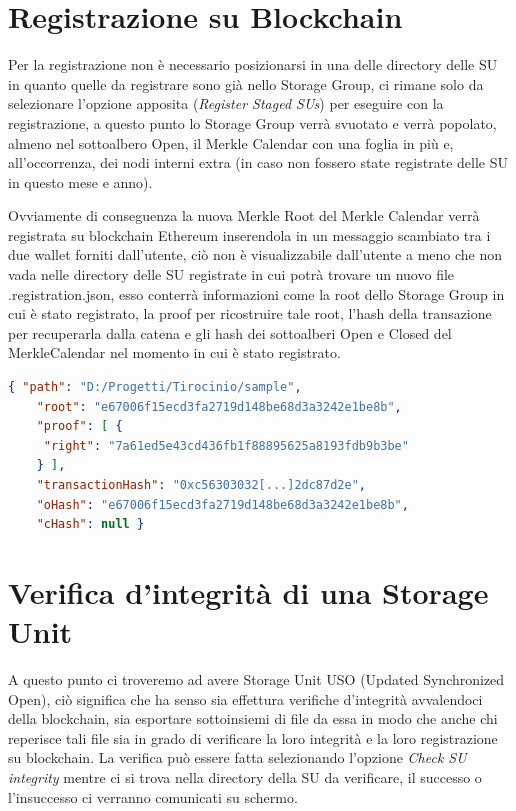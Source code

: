 \section{Registrazione su Blockchain}
\label{sub:regbc}
Per la registrazione non è necessario posizionarsi in una delle directory delle SU
in quanto quelle da registrare sono già nello Storage Group, ci rimane solo
da selezionare l’opzione apposita (\emph{Register Staged SUs}) per eseguire
con la registrazione, a questo punto lo Storage Group verrà svuotato
e verrà popolato, almeno nel sottoalbero Open, il Merkle Calendar con una foglia
in più e, all’occorrenza, dei nodi interni extra (in caso non fossero state
registrate delle SU in questo mese e anno).

Ovviamente di conseguenza la nuova Merkle Root del Merkle Calendar verrà registrata su
blockchain Ethereum inserendola in un messaggio scambiato tra i due wallet forniti dall’utente,
ciò non è visualizzabile dall’utente a meno che non vada nelle directory delle SU registrate 
in cui potrà trovare un nuovo file \textsf{.registration.json}, esso conterrà informazioni
come la root dello Storage Group in cui è stato registrato, la proof per ricostruire tale root,
l’hash della transazione per recuperarla dalla catena e gli hash dei sottoalberi Open e Closed
del MerkleCalendar nel momento in cui è stato registrato.
\newpage
\begin{lstlisting}[language=json,firstnumber=1]
    { "path": "D:/Progetti/Tirocinio/sample",
    "root": "e67006f15ecd3fa2719d148be68d3a3242e1be8b",
    "proof": [ {
     "right": "7a61ed5e43cd436fb1f88895625a8193fdb9b3be"
    } ],
    "transactionHash": "0xc56303032[...]2dc87d2e",
    "oHash": "e67006f15ecd3fa2719d148be68d3a3242e1be8b",
    "cHash": null }  
\end{lstlisting}

\section{Verifica d’integrità di una Storage Unit}

A questo punto ci troveremo ad avere Storage Unit USO (Updated Synchronized Open), ciò
significa che ha senso sia effettura verifiche d’integrità avvalendoci della blockchain,
sia esportare sottoinsiemi di file da essa in modo che anche chi reperisce tali file sia
in grado di verificare la loro integrità e la loro registrazione su blockchain.
La verifica può essere fatta selezionando l’opzione \emph{Check SU integrity}
mentre ci si trova nella directory della SU da verificare, il successo o
l’insuccesso ci verranno comunicati su schermo.

